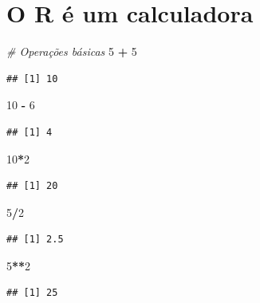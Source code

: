 \documentclass[
]{article}
\newenvironment{Shaded}{\begin{snugshade}}{\end{snugshade}}
\newcommand{\CommentTok}[1]{\textcolor[rgb]{0.56,0.35,0.01}{\textit{#1}}}
\newcommand{\DecValTok}[1]{\textcolor[rgb]{0.00,0.00,0.81}{#1}}
\newcommand{\OperatorTok}[1]{\textcolor[rgb]{0.81,0.36,0.00}{\textbf{#1}}}
\newcommand{\StringTok}[1]{\textcolor[rgb]{0.31,0.60,0.02}{#1}}
\begin{document}
\hypertarget{o-r-uxe9-um-calculadora}{%
\section{O R é um calculadora}\label{o-r-uxe9-um-calculadora}}

\begin{Shaded}
\begin{Highlighting}[]
\CommentTok{# Operações básicas}
\DecValTok{5} \OperatorTok{+}\StringTok{ }\DecValTok{5}
\end{Highlighting}
\end{Shaded}

\begin{verbatim}
## [1] 10
\end{verbatim}

\begin{Shaded}
\begin{Highlighting}[]
\DecValTok{10} \OperatorTok{-}\StringTok{ }\DecValTok{6}
\end{Highlighting}
\end{Shaded}

\begin{verbatim}
## [1] 4
\end{verbatim}

\begin{Shaded}
\begin{Highlighting}[]
\DecValTok{10}\OperatorTok{*}\DecValTok{2}
\end{Highlighting}
\end{Shaded}

\begin{verbatim}
## [1] 20
\end{verbatim}

\begin{Shaded}
\begin{Highlighting}[]
\DecValTok{5}\OperatorTok{/}\DecValTok{2}
\end{Highlighting}
\end{Shaded}

\begin{verbatim}
## [1] 2.5
\end{verbatim}

\begin{Shaded}
\begin{Highlighting}[]
\DecValTok{5}\OperatorTok{**}\DecValTok{2}
\end{Highlighting}
\end{Shaded}

\begin{verbatim}
## [1] 25
\end{verbatim}
\end{document}
